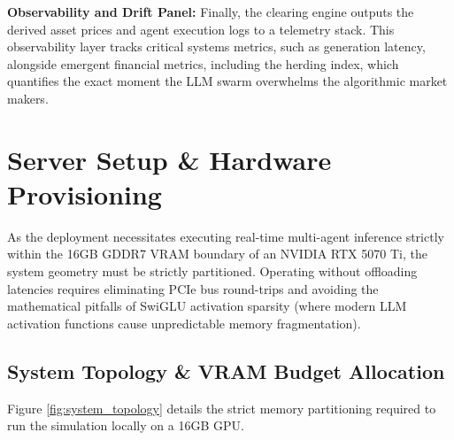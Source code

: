 \documentclass[10pt,a4paper]{article}
\begin{document}
\textbf{Observability and Drift Panel:} Finally, the clearing engine outputs the derived asset prices and agent execution logs to a telemetry stack. This observability layer tracks critical systems metrics, such as generation latency, alongside emergent financial metrics, including the herding index, which quantifies the exact moment the LLM swarm overwhelms the algorithmic market makers.

\section{Server Setup \& Hardware Provisioning}

As the deployment necessitates executing real-time multi-agent inference strictly within the 16GB GDDR7 VRAM boundary of an NVIDIA RTX 5070 Ti, the system geometry must be strictly partitioned. Operating without offloading latencies requires eliminating PCIe bus round-trips and avoiding the mathematical pitfalls of SwiGLU activation sparsity (where modern LLM activation functions cause unpredictable memory fragmentation).

\subsection{System Topology \& VRAM Budget Allocation}

Figure \ref{fig:system_topology} details the strict memory partitioning required to run the simulation locally on a 16GB GPU.
\end{document}
